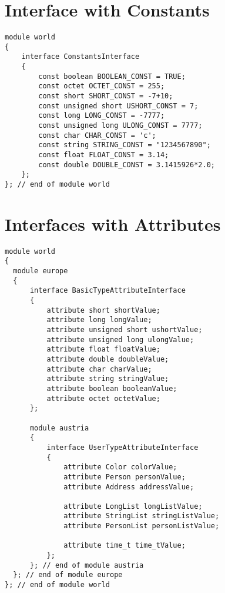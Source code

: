 \section{Interface with Constants}
\begin{small}
\begin{verbatim}
module world
{
    interface ConstantsInterface
    {
        const boolean BOOLEAN_CONST = TRUE;
        const octet OCTET_CONST = 255;
        const short SHORT_CONST = -7+10;
        const unsigned short USHORT_CONST = 7;
        const long LONG_CONST = -7777;
        const unsigned long ULONG_CONST = 7777;
        const char CHAR_CONST = 'c';
        const string STRING_CONST = "1234567890";  
        const float FLOAT_CONST = 3.14;
        const double DOUBLE_CONST = 3.1415926*2.0;
    };
}; // end of module world
\end{verbatim}
\end{small}


\section{Interfaces with Attributes}
\begin{small}
\begin{verbatim}
module world 
{
  module europe 
  {
      interface BasicTypeAttributeInterface
      {
          attribute short shortValue;
          attribute long longValue;
          attribute unsigned short ushortValue;
          attribute unsigned long ulongValue;
          attribute float floatValue;
          attribute double doubleValue;
          attribute char charValue;
          attribute string stringValue;
          attribute boolean booleanValue;
          attribute octet octetValue;
      };
    
      module austria
      {    
          interface UserTypeAttributeInterface
          {
              attribute Color colorValue;
              attribute Person personValue;
              attribute Address addressValue;
  
              attribute LongList longListValue;
              attribute StringList stringListValue;
              attribute PersonList personListValue;
      
              attribute time_t time_tValue;
          };
      }; // end of module austria
  }; // end of module europe
}; // end of module world
\end{verbatim}
\end{small}


